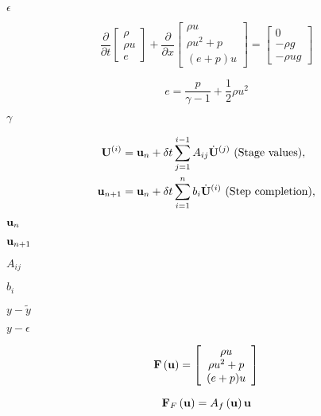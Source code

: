 \documentclass{article}
\begin{document}
$\epsilon$
\pagebreak

\begin{equation} \frac {\partial} {\partial t} \left[\begin{array}{c} \rho \\ \rho u \\ e \end{array}\right] + \frac {\partial} {\partial x} \left[\begin{array}{c} \rho u \\ \rho u^2 + p \\ (e+p) u\end{array}\right] = \left[\begin{array}{c} 0 \\ -\rho g \\ -\rho u g \end{array}\right] \end{equation}
\pagebreak

\begin{equation} e = \frac {p} {\gamma-1} + \frac{1}{2} \rho u^2 \end{equation}
\pagebreak

$\gamma$
\pagebreak

\begin{align} {\bf U}^{\left(i\right)} &= {\bf u}_n + \delta t \sum_{j=1}^{i-1} A_{ij} \dot{\bf U}^{\left(j\right)}\ {\rm (Stage\ values)},\\ {\bf u}_{n+1} &= {\bf u}_n + \delta t \sum_{i=1}^{n} b_i \dot{\bf U}^{\left(i\right)}\ {\rm (Step\ completion)}, \end{align}
\pagebreak

${\bf u}_n$
\pagebreak

${\bf u}_{n+1}$
\pagebreak

$A_{ij}$
\pagebreak

$b_i$
\pagebreak

$y-\tilde{y}$
\pagebreak

$y-\epsilon$
\pagebreak

\begin{equation} {\bf F}\left({\bf u}\right) = \left[\begin{array}{c} \rho u \\ \rho u^2 + p \\ (e+p) u \end{array}\right] \end{equation}
\pagebreak

\begin{equation} {\bf F}_F\left({\bf u}\right) = A_f\left({\bf u}\right){\bf u} \end{equation}
\pagebreak
\end{document}
